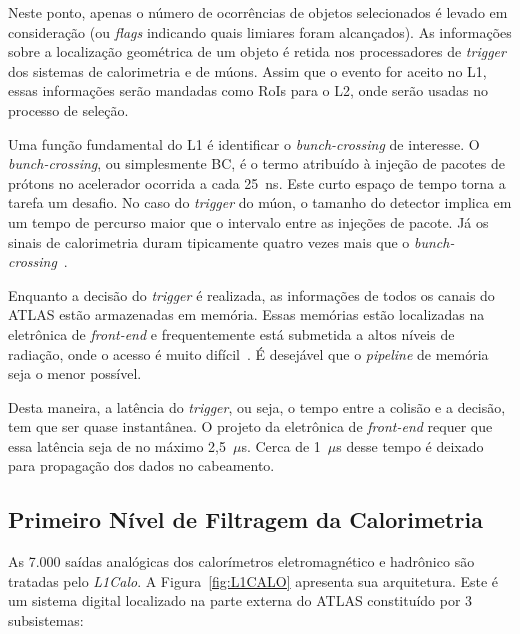 Neste ponto, apenas o número de ocorrências de objetos selecionados é levado em
consideração (ou \emph{flags} indicando quais limiares foram alcançados). As
informações sobre a localização geométrica de um objeto é retida nos
processadores de \emph{trigger} dos sistemas de calorimetria e de múons. Assim
que o evento for aceito no L1, essas informações serão mandadas como RoIs para o
L2, onde serão usadas no processo de seleção.

Uma função fundamental do L1 é identificar o \emph{bunch-crossing} de interesse.
O \emph{bunch-crossing}, ou simplesmente BC, é o termo atribuído à injeção de
pacotes de prótons no acelerador ocorrida a cada 25~ns. Este curto espaço de
tempo torna a tarefa um desafio. No caso do \emph{trigger} do múon, o tamanho do
detector implica em um tempo de percurso maior que o intervalo entre as injeções
de pacote. Já os sinais de calorimetria duram tipicamente quatro vezes mais que
o \emph{bunch-crossing}~\cite{ATLAS2008}.

Enquanto a decisão do \emph{trigger} é realizada, as informações de todos os
canais do ATLAS estão armazenadas em memória. Essas memórias estão localizadas na
eletrônica de \emph{front-end} e frequentemente está submetida a altos níveis de
radiação, onde o acesso é muito difícil~\cite{ATLAS2008}. É desejável que o
\emph{pipeline} de memória seja o menor possível.

Desta maneira, a latência do \emph{trigger}, ou seja, o tempo entre a colisão e
a decisão, tem que ser quase instantânea. O projeto da eletrônica de
\emph{front-end} requer que essa latência seja de no máximo 2,5~$\mu$s. Cerca de
1~$\mu$s desse tempo é deixado para propagação dos dados no cabeamento.

\subsection*{Primeiro Nível de Filtragem da Calorimetria}

As 7.000 saídas analógicas dos calorímetros eletromagnético e hadrônico são
tratadas pelo \emph{L1Calo}. A Figura~\ref{fig:L1CALO} apresenta sua
arquitetura. Este é um sistema digital localizado na parte externa do ATLAS
constituído por 3 subsistemas:

